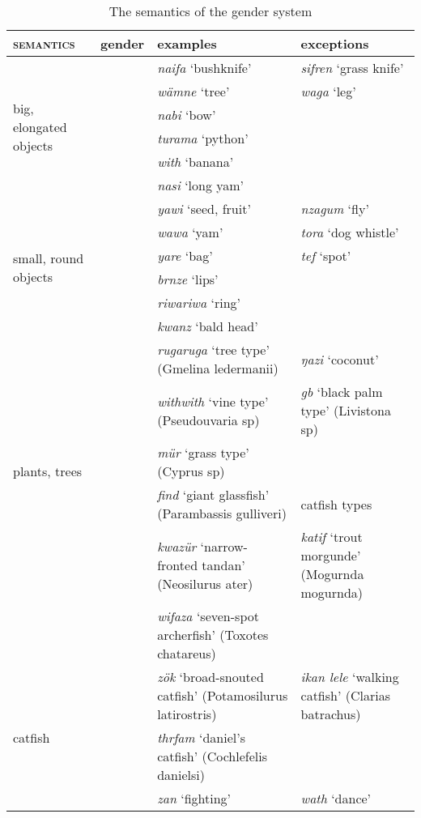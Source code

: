 {\renewcommand{\tabcolsep}{3pt}
\begin{table}
\caption{The semantics of the gender system}
\label{wordclasses-gendersem}
	\begin{tabular}	{p{2cm}lp{}p{}}
		\lsptoprule
		\textsc{semantics}&{gender}&{examples}&{exceptions}\\\midrule
		\multirow{6}{1,8cm}{big, elongated objects}&\multirow{6}{*}{\Masc}&\emph{naifa} `bushknife'&\emph{sifren} `grass knife'\\
		&&\emph{wämne} `tree'&\emph{waga} `leg'\\
		&&\emph{nabi} `bow'&\\
		&&\emph{turama} `python'&\\
		&&\emph{with} `banana'&\\
		&&\emph{nasi} `long yam'&\\\midrule
		\multirow{6}{1,8cm}{small, round objects}&\multirow{6}{*}{\F}&\emph{yawi} `seed, fruit'&\emph{nzagum} `fly'\\
		&&\emph{wawa} `yam'&\emph{tora} `dog whistle'\\
		&&\emph{yare} `bag'&\emph{tef} `spot'\\
		&&\emph{brnze} `lips'&\\
		&&\emph{riwariwa} `ring'&\\
		&&\emph{kwanz} `bald head'&\\\midrule
		\multirow{5}{1,8cm}{plants, trees}&\multirow{5}{*}{\Masc}&\emph{rugaruga} `tree type' (Gmelina ledermanii)&\emph{ŋazi} `coconut'\\
		&&\emph{withwith} `vine type' (Pseudouvaria sp)&\emph{gb} `black palm type' (Livistona sp)\\
		&&\emph{mür} `grass type' (Cyprus sp)&\\\midrule
		\multirow{6}{1,8cm}{fish}&\multirow{6}{*}{\Masc}&\emph{find} `giant glassfish' (Parambassis gulliveri)&catfish types\\
		&&\emph{kwazür} `narrow-fronted tandan' (Neosilurus ater)&\emph{katif} `trout morgunde' (Mogurnda mogurnda)\\
		&&\emph{wifaza} `seven-spot archerfish' (Toxotes chatareus)&\\\midrule
		\multirow{4}{1,8cm}{catfish}&\multirow{4}{*}{\F}&\emph{zök} `broad-snouted catfish' (Potamosilurus latirostris)&\emph{ikan lele} `walking catfish' (Clarias batrachus)\\
		&&\emph{thrfam} `daniel's catfish' (Cochlefelis danielsi)&\\\midrule
		\multirow{3}{1,8cm}{events}&\multirow{3}{*}{\F}&\emph{zan} `fighting'&\emph{wath} `dance'\\

\end{tabular}
\end{table}}
